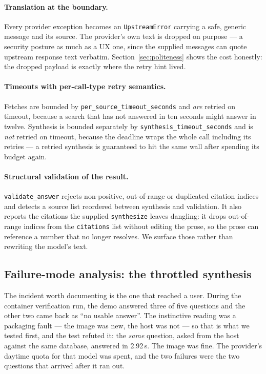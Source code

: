 \documentclass[10pt,a4paper]{article}
\begin{document}
\paragraph{Translation at the boundary.} Every provider exception becomes an
\texttt{UpstreamError} carrying a safe, generic message and its source. The provider's own text
is dropped on purpose --- a security posture as much as a UX one, since the supplied messages can
quote upstream response text verbatim. Section~\ref{sec:politeness} shows the cost honestly: the
dropped payload is exactly where the retry hint lived.

\paragraph{Timeouts with per-call-type retry semantics.} Fetches are bounded by
\texttt{per\_source\_timeout\_seconds} and \emph{are} retried on timeout, because a search that
has not answered in ten seconds might answer in twelve. Synthesis is bounded separately by
\texttt{synthesis\_timeout\_seconds} and is \emph{not} retried on timeout, because the deadline
wraps the whole call including its retries --- a retried synthesis is guaranteed to hit the same
wall after spending its budget again.

\paragraph{Structural validation of the result.} \texttt{validate\_answer} rejects non-positive,
out-of-range or duplicated citation indices and detects a source list reordered between synthesis
and validation. It also reports the citations the supplied \texttt{synthesize} leaves dangling:
it drops out-of-range indices from the \texttt{citations} list without editing the prose, so the
prose can reference a number that no longer resolves. We surface those rather than rewriting the
model's text.

\subsection{Failure-mode analysis: the throttled synthesis}

The incident worth documenting is the one that reached a user. During the container
verification run, the demo answered three of five questions and the other two came back as
``no usable answer''. The instinctive reading was a packaging fault --- the image was new, the
host was not --- so that is what we tested first, and the test refuted it: the \emph{same}
question, asked from the host against the same database, answered in 2.92\,s. The image was
fine. The provider's daytime quota for that model was spent, and the two failures were the two
questions that arrived after it ran out.
\end{document}
